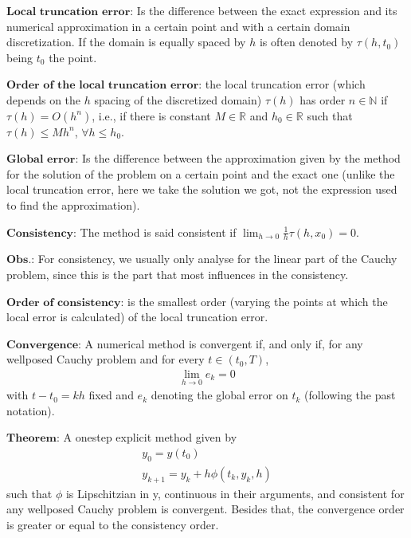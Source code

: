 \documentclass[letterpaper,10pt,english]{jupyterBook}
\begin{document}
\sphinxAtStartPar
\(\textbf{Local truncation error:}\) Is the difference between the exact expression and its numerical approximation in a certain point and with a certain domain discretization. If the domain is equally spaced by \(h\) is often denoted by \(\tau(h,t_0)\) being \(t_0\) the point.

\sphinxAtStartPar
\(\textbf{Order of the local truncation error:}\) the local truncation error (which depends on the \(h\) spacing of the discretized domain) \(\tau(h)\) has order \(n \in \mathbb{N}\) if \(\tau(h) = O(h^n) \), i.e., if there is constant \(M \in \mathbb{R}\) and \(h_0 \in \mathbb{R}\) such that \(\tau(h) \leq M h^n\), \(\forall h \leq h_0\).

\sphinxAtStartPar
\(\textbf{Global error:}\) Is the difference between the approximation given by the method for the solution of the problem on a certain point and the exact one (unlike the local truncation error, here we take the solution we got, not the expression used to find the approximation).

\sphinxAtStartPar
\(\textbf{Consistency:}\) The method is said consistent if \(\lim _{h \to 0} \frac{1}{h}\tau(h,x_0) = 0\).

\sphinxAtStartPar
\(\textbf{Obs.:}\) For consistency, we usually only analyse for the linear part of the Cauchy problem, since this is the part that most influences in the consistency.

\sphinxAtStartPar
\(\textbf{Order of consistency:}\) is the smallest order (varying the points at which the local error is calculated) of the local truncation error.

\sphinxAtStartPar
\(\textbf{Convergence:}\) A numerical method is convergent if, and only if, for any well\sphinxhyphen{}posed Cauchy problem and for every \(t \in (t_0, T)\),
\begin{equation*}
\begin{split}\lim_{h \to 0} e_k = 0\end{split}
\end{equation*}
\sphinxAtStartPar
with \(t - t_0 = kh\) fixed and \(e_k\) denoting the global error on \(t_k\) (following the past notation).

\sphinxAtStartPar
\(\textbf{Theorem:}\) A one\sphinxhyphen{}step explicit method given by
\begin{equation*}
\begin{split}
y_0 = y(t_0) \\
y_{k+1} = y_{k} + h \phi (t_{k},y_{k},h)
\end{split}
\end{equation*}
\sphinxAtStartPar
such that \(\phi\) is Lipschitzian in y, continuous in their arguments, and consistent for any well\sphinxhyphen{}posed Cauchy problem is convergent. Besides that, the convergence order is greater or equal to the consistency order.
\end{document}
